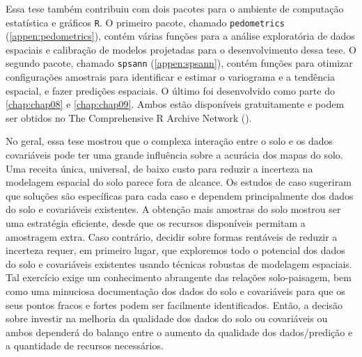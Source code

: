 Essa tese também contribuiu com dois pacotes para o ambiente de computação estatística e gráficos \texttt{R}. 
O primeiro pacote, chamado \texttt{pedometrics} (\autoref{appen:pedometrics}), contém várias funções para a 
análise exploratória de dados espaciais e calibração de modelos projetadas para o desenvolvimento dessa tese. 
O segundo pacote, chamado \texttt{spsann} (\autoref{appen:spsann}), contém funções para otimizar configurações 
amostrais para identificar e estimar o variograma e a tendência espacial, e fazer predições espaciais. O 
último foi desenvolvido como parte do \autoref{chap:chap08} e \autoref{chap:chap09}. Ambos estão disponíveis 
gratuitamente e podem ser obtidos no The Comprehensive R Archive Network (\cran).

No geral, essa tese mostrou que o complexa interação entre o solo e os dados covariáveis pode ter uma grande 
influência sobre a acurácia dos mapas do solo. Uma receita única, universal, de baixo custo para reduzir a 
incerteza na modelagem espacial do solo parece fora de alcance. Os estudos de caso sugeriram que soluções são 
específicas para cada caso e dependem principalmente dos dados do solo e covariáveis existentes. A obtenção 
mais amostras do solo mostrou ser uma estratégia eficiente, desde que os recursos disponíveis permitam a 
amostragem extra. Caso contrário, decidir sobre formas rentáveis de reduzir a incerteza requer, em primeiro 
lugar, que exploremos todo o potencial dos dados do solo e covariáveis existentes usando técnicas robustas de 
modelagem espaciais. Tal exercício exige um conhecimento abrangente das relações solo-paisagem, bem como uma 
minuciosa documentação dos dados do solo e covariáveis para que os seus pontos fracos e fortes podem ser 
facilmente identificados. Então, a decisão sobre investir na melhoria da qualidade dos dados do solo ou 
covariáveis ou ambos dependerá do balanço entre o aumento da qualidade dos dados/predição e a quantidade de 
recursos necessários.
